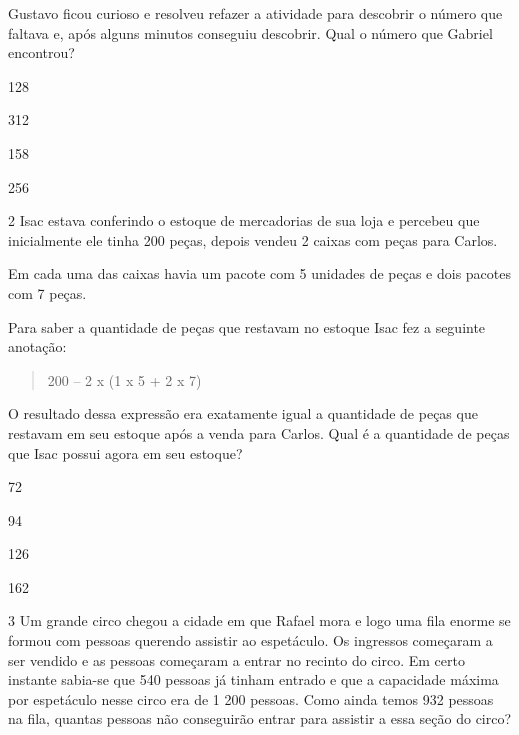 
Gustavo ficou curioso e resolveu refazer a atividade para descobrir o
número que faltava e, após alguns minutos conseguiu descobrir. Qual o
número que Gabriel encontrou?

\begin{escolha}
\item
  128
\item
  312
\item
  158
\item
  256
\end{escolha}


\num{2} Isac estava conferindo o estoque de mercadorias de sua loja e
percebeu que inicialmente ele tinha 200 peças, depois vendeu 2 caixas
com peças para Carlos.

Em cada uma das caixas havia um pacote com 5 unidades de peças e dois
pacotes com 7 peças.

Para saber a quantidade de peças que restavam no estoque Isac fez a
seguinte anotação:

\begin{quote}
200 -- 2 x (1 x 5 + 2 x 7)
\end{quote}

O resultado dessa expressão era exatamente igual a quantidade de peças
que restavam em seu estoque após a venda para Carlos. Qual é a
quantidade de peças que Isac possui agora em seu estoque?

\begin{escolha}
\item
  72
\item
  94
\item
  126
\item
  162
\end{escolha}


\num{3} Um grande circo chegou a cidade em que Rafael mora e logo uma fila
enorme se formou com pessoas querendo assistir ao espetáculo. Os
ingressos começaram a ser vendido e as pessoas começaram a entrar no
recinto do circo. Em certo instante sabia-se que 540 pessoas já tinham
entrado e que a capacidade máxima por espetáculo nesse circo era de 1
200 pessoas. Como ainda temos 932 pessoas na fila, quantas pessoas não
conseguirão entrar para assistir a essa seção do circo?

